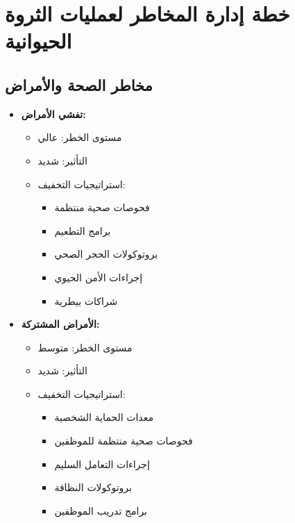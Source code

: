 \section{خطة إدارة المخاطر لعمليات الثروة الحيوانية}

\subsection{مخاطر الصحة والأمراض}
\begin{itemize}
    \item \textbf{تفشي الأمراض:}
    \begin{itemize}
        \item مستوى الخطر: عالي
        \item التأثير: شديد
        \item استراتيجيات التخفيف:
        \begin{itemize}
            \item فحوصات صحية منتظمة
            \item برامج التطعيم
            \item بروتوكولات الحجر الصحي
            \item إجراءات الأمن الحيوي
            \item شراكات بيطرية
        \end{itemize}
    \end{itemize}
    
    \item \textbf{الأمراض المشتركة:}
    \begin{itemize}
        \item مستوى الخطر: متوسط
        \item التأثير: شديد
        \item استراتيجيات التخفيف:
        \begin{itemize}
            \item معدات الحماية الشخصية
            \item فحوصات صحية منتظمة للموظفين
            \item إجراءات التعامل السليم
            \item بروتوكولات النظافة
            \item برامج تدريب الموظفين
        \end{itemize}
    \end{itemize}
\end{itemize}

